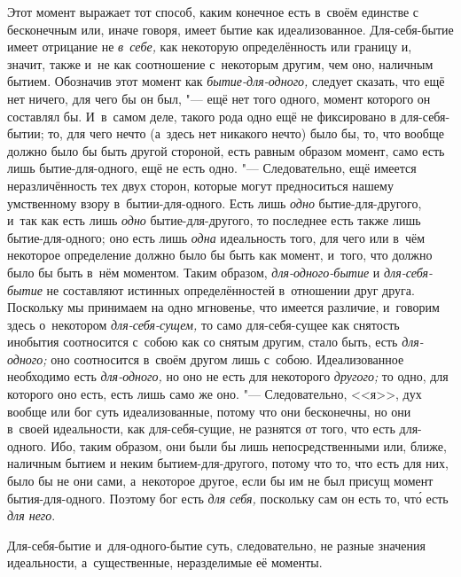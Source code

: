 
Этот момент выражает тот способ, каким конечное есть в~своём единстве с
бесконечным или, иначе говоря, имеет бытие как идеализованное.
Для-себя-бытие имеет отрицание не {\em в~себе,} как
некоторую определённость или границу и, значит, также и~не как соотношение
с~некоторым другим, чем оно, наличным бытием. Обозначив этот момент как
{\em бытие-для-одного,} следует сказать, что ещё нет
ничего, для чего бы он был, "--- ещё нет того одного, момент которого он
составлял бы. И~в~самом деле, такого рода одно ещё не фиксировано в
для-себя-бытии; то, для чего нечто (а~здесь нет никакого нечто) было бы,
то, что вообще должно было бы быть другой стороной, есть равным образом
момент, само есть лишь бытие-для-одного, ещё не есть одно. "--- Следовательно,
ещё имеется неразличённость тех двух сторон, которые могут предноситься
нашему умственному взору в~бытии-для-одного. Есть лишь
{\em одно} бытие-для-другого, и~так как есть лишь
{\em одно} бытие-для-другого, то последнее есть также
лишь бытие-для-одного; оно есть лишь {\em одна}
идеальность того, для чего или в~чём некоторое определение должно было бы
быть как момент, и~того, что должно было бы быть в~нём моментом. Таким
образом, {\em для-одного-бытие} и
{\em для-себя-бытие} не составляют истинных
определённостей в~отношении друг друга. Поскольку мы принимаем на одно
мгновенье, что имеется различие, и~говорим здесь о~некотором
{\em для-себя-сущем,} то само для-себя-сущее как
снятость инобытия соотносится с~собою как со снятым другим, стало быть,
есть {\em для-одного;} оно соотносится в~своём другом
лишь с~собою. Идеализованное необходимо есть
{\em для-одного,} но оно не есть для некоторого
{\em другого;} то одно, для которого оно есть, есть
лишь само же оно. "--- Следовательно, <<я>>, дух вообще или бог суть
идеализованные, потому что они бесконечны, но они в~своей идеальности, как
для-себя-сущие, не разнятся от того, что есть для-одного. Ибо, таким
образом, они были бы лишь непосредственными или, ближе, наличным бытием и
неким бытием-для-другого, потому что то, что есть для них, было бы не они
сами, а~некоторое другое, если бы им не был присущ момент бытия-для-одного.
Поэтому бог есть {\em для себя,} поскольку сам он есть
то, чт\'{о} есть {\em для него}.

Для-себя-бытие и~для-одного-бытие суть, следовательно, не разные значения
идеальности, а~существенные, неразделимые её моменты.


